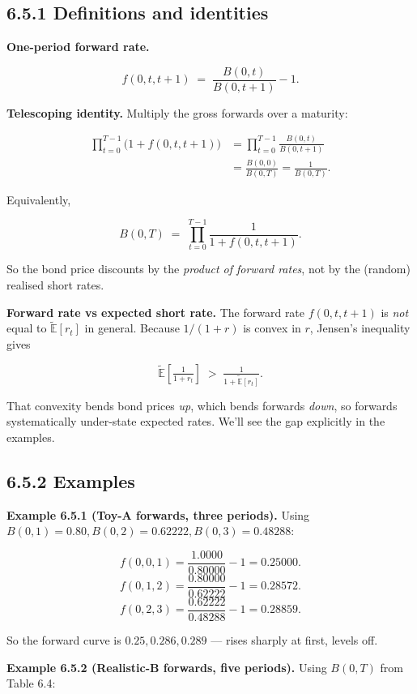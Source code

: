 \documentclass[
  10pt,
  twoside]{book}
\begin{document}
\subsection{6.5.1 Definitions and
identities}\label{definitions-and-identities-1}

\textbf{One-period forward rate.}

\[f(0, t, t+1) \;=\; \frac{B(0, t)}{B(0, t+1)} - 1.\]

\textbf{Telescoping identity.} Multiply the gross forwards over a
maturity:

\[\begin{aligned}
\prod_{t = 0}^{T-1} \bigl(1 + f(0, t, t+1)\bigr) &= \prod_{t=0}^{T-1}\frac{B(0, t)}{B(0, t+1)} \\
&= \frac{B(0, 0)}{B(0, T)} = \frac{1}{B(0, T)}.
\end{aligned}\]

Equivalently,

\[B(0, T) \;=\; \prod_{t = 0}^{T-1}\frac{1}{1 + f(0, t, t+1)}.\]

So the bond price discounts by the \emph{product of forward rates}, not
by the (random) realised short rates.

\textbf{Forward rate vs expected short rate.} The forward rate
\(f(0, t, t+1)\) is \emph{not} equal to \(\tilde{\mathbb E}[r_t]\) in
general. Because \(1/(1 + r)\) is convex in \(r\), Jensen's inequality
gives

\[\tilde{\mathbb E}\!\left[\tfrac{1}{1 + r_t}\right] \;>\; \tfrac{1}{1 + \tilde{\mathbb E}[r_t]}.\]

That convexity bends bond prices \emph{up}, which bends forwards
\emph{down}, so forwards systematically under-state expected rates.
We'll see the gap explicitly in the examples.

\subsection{6.5.2 Examples}\label{examples-31}

\textbf{Example 6.5.1 (Toy-A forwards, three periods).} Using
\(B(0, 1) = 0.80, B(0, 2) = 0.62222, B(0, 3) = 0.48288\):

\[f(0, 0, 1) = \frac{1.0000}{0.80000} - 1 = 0.25000.\]
\[f(0, 1, 2) = \frac{0.80000}{0.62222} - 1 = 0.28572.\]
\[f(0, 2, 3) = \frac{0.62222}{0.48288} - 1 = 0.28859.\]

So the forward curve is \(0.25, 0.286, 0.289\) --- rises sharply at
first, levels off.

\textbf{Example 6.5.2 (Realistic-B forwards, five periods).} Using
\(B(0, T)\) from Table 6.4:
\end{document}
